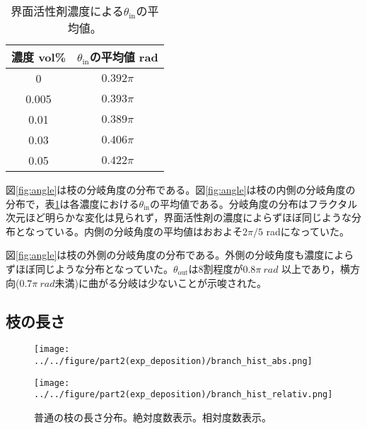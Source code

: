 \documentclass[autodetect-engine,dvi=dvipdfmx,a4paper,ja=standard,oneside,openany,11pt]{bxjsbook}
\begin{document}
\begin{table}
  \centering
  \caption{界面活性剤濃度による$\theta_{\mathrm{in}}$の平均値。}
  \begin{tabular}{|c|c|}
    \hline
    濃度 vol\% & $\theta_{\mathrm{in}}$の平均値 rad \\
    \hline\hline
    0        & $0.392\pi$                     \\ \hline
    0.005    & $0.393\pi$                     \\ \hline
    0.01     & $0.389\pi$                     \\ \hline
    0.03     & $0.406\pi$                     \\ \hline
    0.05     & $0.422\pi$                     \\
    \hline
  \end{tabular}
  \label{tab:angle_average}
\end{table}

図\ref{fig:angle}は枝の分岐角度の分布である。図\ref{fig:angle}は枝の内側の分岐角度の分布で，表\ref{tab:angle_average}は各濃度における$\theta_{\mathrm{in}}$の平均値である。分岐角度の分布はフラクタル次元ほど明らかな変化は見られず，界面活性剤の濃度によらずほぼ同じような分布となっている。内側の分岐角度の平均値はおおよそ$2\pi/5$ radになっていた。

図\ref{fig:angle}は枝の外側の分岐角度の分布である。外側の分岐角度も濃度によらずほぼ同じような分布となっていた。$\theta_{\mathrm{out}}$は8割程度が$0.8\pi \ \si{rad}$ 以上であり，横方向($0.7\pi \ \si{rad}$未満)に曲がる分岐は少ないことが示唆された。
\subsection{枝の長さ}

\begin{figure}[htbp]
  \begin{minipage}
    {0.45\textwidth}
    \subcaption{}
    \centering
    \texttt{[image: ../../figure/part2(exp\_deposition)/branch\_hist\_abs.png]}
    \label{fig:branch_length_absolute}
  \end{minipage}
  \begin{minipage}
    {0.45\textwidth}
    \subcaption{}
    \centering
    \texttt{[image: ../../figure/part2(exp\_deposition)/branch\_hist\_relativ.png]}
    \label{fig:branch_length_relativ}
  \end{minipage}
  \caption{普通の枝の長さ分布。絶対度数表示。相対度数表示。}
  \label{fig:branch_length}
\end{figure}
\end{document}
